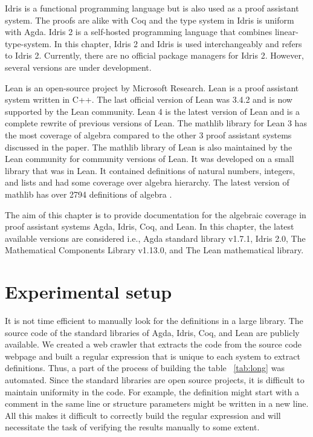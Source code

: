 Idris is a functional programming language but is also used as a proof
assistant system. The proofs are alike with Coq and the type system in Idris is
uniform with Agda. Idris 2 is a self-hosted programming language that combines
linear-type-system. In this chapter, Idris 2 and Idris is used interchangeably
and refers to Idris 2. Currently, there are no official package managers for
Idris 2. However, several versions are under development. 

Lean \cite{10.1145/3372885.3373824} is an open-source project by Microsoft
Research. Lean is a proof assistant system written in C++. The last official
version of Lean was 3.4.2 and is now supported by the Lean community. Lean 4 is
the latest version of Lean and is a complete rewrite of previous versions of
Lean. The mathlib \cite{10.1145/3372885.3373824} library for Lean 3 has the most
coverage of algebra compared to the other 3 proof assistant systems discussed in
the paper. The mathlib library of Lean is also maintained by the Lean community
for community versions of Lean. It was developed on a small library that was in
Lean. It contained definitions of natural numbers, integers, and lists and had
some coverage over algebra hierarchy. The latest version of mathlib has over
2794 definitions of algebra \cite{2019arXiv191203028S}.

The aim of this chapter is to provide documentation for the algebraic coverage
in proof assistant systems Agda, Idris, Coq, and Lean. In this chapter, the
latest available versions are considered i.e., Agda standard library v1.7.1, Idris
2.0, The Mathematical Components Library v1.13.0, and The Lean mathematical
library. 

\section{Experimental setup}
It is not time efficient to manually look for the definitions in a large
library. The source code of the standard libraries of Agda, Idris, Coq, and Lean
are publicly available. We created a web crawler that extracts the code from the
source code webpage and built a regular expression that is unique to each system
to extract definitions. Thus, a part of the process of building the table
~\ref{tab:long} was automated. Since the standard libraries are open source
projects, it is difficult to maintain uniformity in the code. For example, the
definition might start with a comment in the same line or structure parameters
might be written in a new line. All this makes it difficult to correctly build
the regular expression and will necessitate the task of verifying the results
manually to some extent.   

